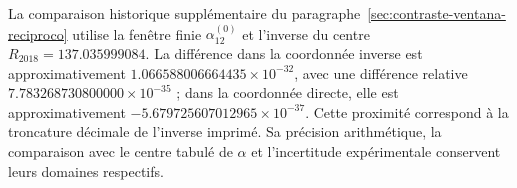 La comparaison historique supplémentaire du
paragraphe~\ref{sec:contraste-ventana-reciproco} utilise la fenêtre finie
\(\alpha_{12}^{(0)}\) et l'inverse du centre
\(R_{2018}=137.035999084\). La différence dans la coordonnée inverse est
approximativement \(1.066588006664435\times10^{-32}\), avec une différence
relative \(7.783268730800000\times10^{-35}\) ; dans la coordonnée directe,
elle est approximativement \(-5.679725607012965\times10^{-37}\).
Cette proximité correspond à la troncature décimale de l'inverse
imprimé. Sa précision arithmétique, la comparaison avec le centre tabulé
de \(\alpha\) et l'incertitude expérimentale conservent leurs domaines
respectifs.
